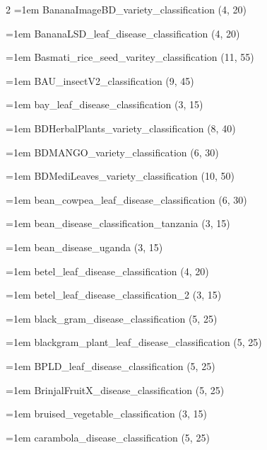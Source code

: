 \begin{multicols}{2}
\hangindent=1em BananaImageBD\_\allowbreak{}variety\_\allowbreak{}classification (4, 20)\par
\hangindent=1em BananaLSD\_\allowbreak{}leaf\_\allowbreak{}disease\_\allowbreak{}classification (4, 20)\par
\hangindent=1em Basmati\_\allowbreak{}rice\_\allowbreak{}seed\_\allowbreak{}varitey\_\allowbreak{}classification (11, 55)\par
\hangindent=1em BAU\_\allowbreak{}insectV2\_\allowbreak{}classification (9, 45)\par
\hangindent=1em bay\_\allowbreak{}leaf\_\allowbreak{}disease\_\allowbreak{}classification (3, 15)\par
\hangindent=1em BDHerbalPlants\_\allowbreak{}variety\_\allowbreak{}classification (8, 40)\par
\hangindent=1em BDMANGO\_\allowbreak{}variety\_\allowbreak{}classification (6, 30)\par
\hangindent=1em BDMediLeaves\_\allowbreak{}variety\_\allowbreak{}classification (10, 50)\par
\hangindent=1em bean\_\allowbreak{}cowpea\_\allowbreak{}leaf\_\allowbreak{}disease\_\allowbreak{}classification (6, 30)\par
\hangindent=1em bean\_\allowbreak{}disease\_\allowbreak{}classification\_\allowbreak{}tanzania (3, 15)\par
\hangindent=1em bean\_\allowbreak{}disease\_\allowbreak{}uganda (3, 15)\par
\hangindent=1em betel\_\allowbreak{}leaf\_\allowbreak{}disease\_\allowbreak{}classification (4, 20)\par
\hangindent=1em betel\_\allowbreak{}leaf\_\allowbreak{}disease\_\allowbreak{}classification\_\allowbreak{}2 (3, 15)\par
\hangindent=1em black\_\allowbreak{}gram\_\allowbreak{}disease\_\allowbreak{}classification (5, 25)\par
\hangindent=1em blackgram\_\allowbreak{}plant\_\allowbreak{}leaf\_\allowbreak{}disease\_\allowbreak{}classification (5, 25)\par
\hangindent=1em BPLD\_\allowbreak{}leaf\_\allowbreak{}disease\_\allowbreak{}classification (5, 25)\par
\hangindent=1em BrinjalFruitX\_\allowbreak{}disease\_\allowbreak{}classification (5, 25)\par
\hangindent=1em bruised\_\allowbreak{}vegetable\_\allowbreak{}classification (3, 15)\par
\hangindent=1em carambola\_\allowbreak{}disease\_\allowbreak{}classification (5, 25)\par

\end{multicols}
